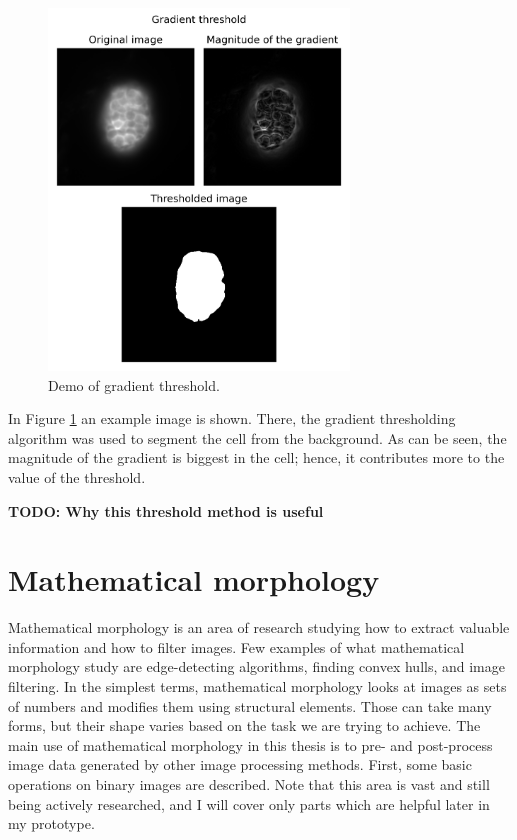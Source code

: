 \documentclass[
  digital,     %
  oneside,     %
  nosansbold,  %
  nocolorbold, %
  lof,         %
  lot,         %
]{fithesis4}
\begin{document}
\begin{figure}
    \begin{center}
        \includegraphics[width=8cm]{"resources/demo-gradient-threshold.png"}
    \end{center}
    \caption{Demo of gradient threshold.}
    \label{fig:demo_grad_thresh}
\end{figure}

In Figure \ref{fig:demo_grad_thresh} an example image is shown. There, the
gradient thresholding algorithm was used to segment the cell from the
background. As can be seen, the magnitude of the gradient is biggest in the
cell; hence, it contributes more to the value of the threshold.

\textbf{TODO: Why this threshold method is useful}

\section{Mathematical morphology}

Mathematical morphology is an area of research studying how to extract valuable
information and how to filter images. Few examples of what mathematical
morphology study are edge-detecting algorithms, finding convex hulls, and image
filtering. In the simplest terms, mathematical morphology looks at images as
sets of numbers and modifies them using structural elements. Those can take many
forms, but their shape varies based on the task we are trying to achieve. The
main use of mathematical morphology in this thesis is to pre- and post-process
image data generated by other image processing methods. First, some basic
operations on binary images are described. Note that this area is vast and still
being actively researched, and I will cover only parts which are helpful later
in my prototype.
\end{document}
